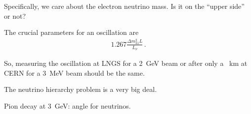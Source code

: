 \documentclass[main.tex]{subfiles}
\begin{document}
Specifically, we care about the electron neutrino mass. Is it on the ``upper side'' 
or not? 

The crucial parameters for an oscillation are 
%
\begin{align}
1.267 \frac{\Delta m_{31}^2 L}{L_\nu }
\,.
\end{align}

So, measuring the oscillation at LNGS for a \SI{2}{GeV} beam 
or after only a \SI{}{km} at CERN for a \SI{3}{MeV} beam should be the same. 

The neutrino hierarchy problem is a very big deal. 

Pion decay at \SI{3}{GeV}: angle for neutrinos. 
\end{document}

